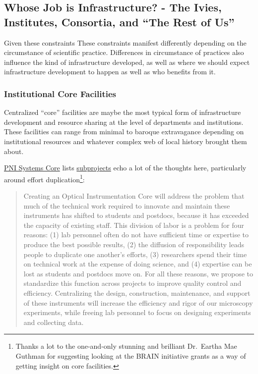 \documentclass[10pt]{article}
\begin{document}
\hypertarget{whose-job-is-infrastructure---the-ivies-institutes-consortia-and-the-rest-of-us}{%
\subsection{Whose Job is Infrastructure? - The Ivies, Institutes,
Consortia, and ``The Rest of
Us''}\label{whose-job-is-infrastructure---the-ivies-institutes-consortia-and-the-rest-of-us}}


\begin{multicols}{2}
 Given these constraints These constraints manifest
differently depending on the circumstance of scientific practice.
Differences in circumstance of practices also influence the kind of
infrastructure developed, as well as where we should expect
infrastructure development to happen as well as who benefits from it.

\hypertarget{institutional-core-facilities}{%
\subsubsection{Institutional Core
Facilities}\label{institutional-core-facilities}}

Centralized ``core'' facilities are maybe the most typical form of
infrastructure development and resource sharing at the level of
departments and institutions. These facilities can range from minimal to
baroque extravagance depending on institutional resources and whatever
complex web of local history brought them about.

\href{https://projectreporter.nih.gov/project_info_details.cfm?aid=9444124}{PNI
Systems Core} lists
\href{https://reporter.nih.gov/project-details/9444124\#sub-Projects}{subprojects}
echo a lot of the thoughts here, particularly around effort
duplication\footnote{Thanks a lot to the one-and-only stunning and
  brilliant Dr.~Eartha Mae Guthman for suggesting looking at the BRAIN
  initiative grants as a way of getting insight on core facilities.}:

\begin{quote}
Creating an Optical Instrumentation Core will address the problem that
much of the technical work required to innovate and maintain these
instruments has shifted to students and postdocs, because it has
exceeded the capacity of existing staff. This division of labor is a
problem for four reasons: (1) lab personnel often do not have sufficient
time or expertise to produce the best possible results, (2) the
diffusion of responsibility leads people to duplicate one another's
efforts, (3) researchers spend their time on technical work at the
expense of doing science, and (4) expertise can be lost as students and
postdocs move on. For all these reasons, we propose to standardize this
function across projects to improve quality control and efficiency.
Centralizing the design, construction, maintenance, and support of these
instruments will increase the efficiency and rigor of our microscopy
experiments, while freeing lab personnel to focus on designing
experiments and collecting data.
\end{quote}


\end{multicols}
\end{document}
